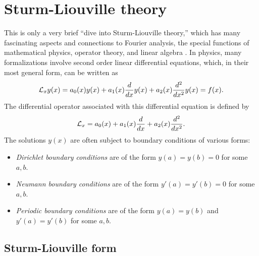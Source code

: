 \chapter{Sturm-Liouville theory}
\label{2011-m-ch-sl}

This is only a very brief ``dive into Sturm-Liouville theory,''
which has many fascinating aspects and connections to Fourier analysis, the
special functions of mathematical physics, operator theory, and linear algebra
\cite{birkhoff-Rota-48,Al-Gwaiz,everitt-handbook-sl}.
In physics, many formalizations involve second order linear differential equations,
which, in their most general form, can be written as \cite{herman-sc}
\begin{equation}
{\cal L}_x y(x) =
a_0(x) y(x)  +
a_1(x) \frac{d}{dx}y(x)+
a_2(x) \frac{d^2}{dx^2}y(x) =
f(x).
\label{2011-m-ch-sl1}
\end{equation}
The differential operator associated with this differential equation is defined by
\begin{equation}
{\cal L}_x  = a_0(x)
+
a_1(x) \frac{d}{dx}+
a_2(x) \frac{d^2}{dx^2}.
\label{2011-m-ch-sl1do}
\end{equation}
The solutions $y(x)$ are often subject to boundary conditions of various forms:
\begin{itemize}
\item
{\em Dirichlet boundary conditions}
are of the form $y(a)=y(b)=0$ for some $a,b$.


\item
{\em Neumann boundary conditions}
are of the form $y'(a)=y'(b)=0$ for some $a,b$.

\item
{\em Periodic boundary conditions}
are of the form $y(a)=y(b)$ and $y'(a)=y'(b)$ for some $a,b$.
\end{itemize}

\section{Sturm-Liouville form}

